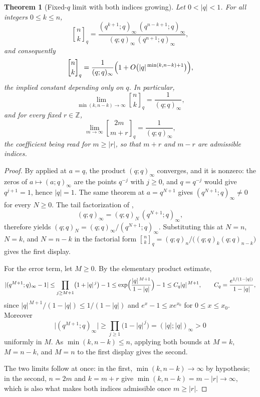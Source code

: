 \documentclass[11pt,oneside,openany]{book}
\newtheorem{theorem}{Theorem}[chapter]
\theoremstyle{definition}
\theoremstyle{remark}
\newcommand{\qbinom}[2]{\genfrac{[}{]}{0pt}{}{#1}{#2}_{q}}
\newcommand{\Z}{\mathbb Z}
\newcommand{\abs}[1]{\lvert #1\rvert}
\begin{document}
\begin{theorem}[Fixed-$q$ limit with both indices growing]\label{thm:central-fixed-q}
Let $0<\abs q<1$.  For all integers $0\le k\le n$,
\[
 \qbinom nk
 =\frac{(q^{k+1};q)_\infty\,(q^{n-k+1};q)_\infty}
       {(q;q)_\infty\,(q^{n+1};q)_\infty},
\]
and consequently
\[
 \qbinom nk
 =\frac1{(q;q)_\infty}
 \Bigl(1+O\bigl(\abs q^{\,\min(k,n-k)+1}\bigr)\Bigr),
\]
the implied constant depending only on $q$.  In particular,
\[
 \lim_{\min(k,n-k)\to\infty}\qbinom nk=\frac1{(q;q)_\infty},
 \tag{19.7}\label{eq:central-fixed-q}
\]
and for every fixed $r\in\Z$,
\[
 \lim_{m\to\infty}\qbinom{2m}{m+r}=\frac1{(q;q)_\infty},
\]
the coefficient being read for $m\ge\abs r$, so that $m+r$ and $m-r$ are
admissible indices.
\end{theorem}

\begin{proof}
By  applied at $a=q$, the product $(q;q)_\infty$
converges, and it is nonzero: the zeros of $a\mapsto(a;q)_\infty$ are the
points $q^{-j}$ with $j\ge0$, and $q=q^{-j}$ would give $q^{j+1}=1$, hence
$\abs q=1$.  The same theorem at $a=q^{N+1}$ gives $(q^{N+1};q)_\infty\ne0$
for every $N\ge0$.  The tail factorization of ,
\[
 (q;q)_\infty=(q;q)_N\,(q^{N+1};q)_\infty,
\]
therefore yields $(q;q)_N=(q;q)_\infty/(q^{N+1};q)_\infty$.  Substituting this
at $N=n$, $N=k$, and $N=n-k$ in the factorial form
$\qbinom nk=(q;q)_n/\bigl((q;q)_k(q;q)_{n-k}\bigr)$ gives the first display.

For the error term, let $M\ge0$.  By the elementary product estimate,
\[
 \abs{(q^{M+1};q)_\infty-1}
 \le\prod_{j\ge M+1}\bigl(1+\abs q^{\,j}\bigr)-1
 \le\exp\Bigl(\frac{\abs q^{\,M+1}}{1-\abs q}\Bigr)-1
 \le C_q\abs q^{\,M+1},
 \qquad
 C_q=\frac{e^{1/(1-\abs q)}}{1-\abs q},
\]
since $\abs q^{\,M+1}/(1-\abs q)\le1/(1-\abs q)$ and $e^x-1\le xe^{x_0}$ for
$0\le x\le x_0$.  Moreover
\[
 \abs{(q^{M+1};q)_\infty}
 \ge\prod_{j\ge1}\bigl(1-\abs q^{\,j}\bigr)
 =(\abs q;\abs q)_\infty>0
\]
uniformly in $M$.  As $\min(k,n-k)\le n$, applying both bounds at $M=k$,
$M=n-k$, and $M=n$ to the first display gives the second.

The two limits follow at once: in the first, $\min(k,n-k)\to\infty$ by
hypothesis; in the second, $n=2m$ and $k=m+r$ give
$\min(k,n-k)=m-\abs r\to\infty$, which is also what makes both indices
admissible once $m\ge\abs r$.
\end{proof}
\end{document}
